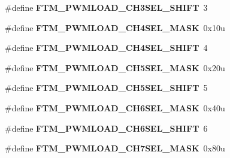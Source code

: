 \begin{DoxyCompactItemize}
\item 
\hypertarget{group___f_t_m___register___masks_ga2af1a060bebe8e48c468cce81a2364d8}{}\#define {\bfseries F\+T\+M\+\_\+\+P\+W\+M\+L\+O\+A\+D\+\_\+\+C\+H3\+S\+E\+L\+\_\+\+S\+H\+I\+F\+T}~3\label{group___f_t_m___register___masks_ga2af1a060bebe8e48c468cce81a2364d8}

\item 
\hypertarget{group___f_t_m___register___masks_ga5c780b58f08500bc357b62c904dc1c97}{}\#define {\bfseries F\+T\+M\+\_\+\+P\+W\+M\+L\+O\+A\+D\+\_\+\+C\+H4\+S\+E\+L\+\_\+\+M\+A\+S\+K}~0x10u\label{group___f_t_m___register___masks_ga5c780b58f08500bc357b62c904dc1c97}

\item 
\hypertarget{group___f_t_m___register___masks_gafdff910b7b4bc4961ef1852efddacbb5}{}\#define {\bfseries F\+T\+M\+\_\+\+P\+W\+M\+L\+O\+A\+D\+\_\+\+C\+H4\+S\+E\+L\+\_\+\+S\+H\+I\+F\+T}~4\label{group___f_t_m___register___masks_gafdff910b7b4bc4961ef1852efddacbb5}

\item 
\hypertarget{group___f_t_m___register___masks_ga1b66f571d4fb653183ca2b59bcfeebce}{}\#define {\bfseries F\+T\+M\+\_\+\+P\+W\+M\+L\+O\+A\+D\+\_\+\+C\+H5\+S\+E\+L\+\_\+\+M\+A\+S\+K}~0x20u\label{group___f_t_m___register___masks_ga1b66f571d4fb653183ca2b59bcfeebce}

\item 
\hypertarget{group___f_t_m___register___masks_gac43e037a7c4b7b7d32dc52b11914d97f}{}\#define {\bfseries F\+T\+M\+\_\+\+P\+W\+M\+L\+O\+A\+D\+\_\+\+C\+H5\+S\+E\+L\+\_\+\+S\+H\+I\+F\+T}~5\label{group___f_t_m___register___masks_gac43e037a7c4b7b7d32dc52b11914d97f}

\item 
\hypertarget{group___f_t_m___register___masks_gaefdd87aac092c115ca16834df416a021}{}\#define {\bfseries F\+T\+M\+\_\+\+P\+W\+M\+L\+O\+A\+D\+\_\+\+C\+H6\+S\+E\+L\+\_\+\+M\+A\+S\+K}~0x40u\label{group___f_t_m___register___masks_gaefdd87aac092c115ca16834df416a021}

\item 
\hypertarget{group___f_t_m___register___masks_ga750eddbdde44f9f3a1a49cb8db15b7de}{}\#define {\bfseries F\+T\+M\+\_\+\+P\+W\+M\+L\+O\+A\+D\+\_\+\+C\+H6\+S\+E\+L\+\_\+\+S\+H\+I\+F\+T}~6\label{group___f_t_m___register___masks_ga750eddbdde44f9f3a1a49cb8db15b7de}

\item 
\hypertarget{group___f_t_m___register___masks_ga03933ee150a126784b19dde95dd28cc9}{}\#define {\bfseries F\+T\+M\+\_\+\+P\+W\+M\+L\+O\+A\+D\+\_\+\+C\+H7\+S\+E\+L\+\_\+\+M\+A\+S\+K}~0x80u\label{group___f_t_m___register___masks_ga03933ee150a126784b19dde95dd28cc9}


\end{DoxyCompactItemize}
